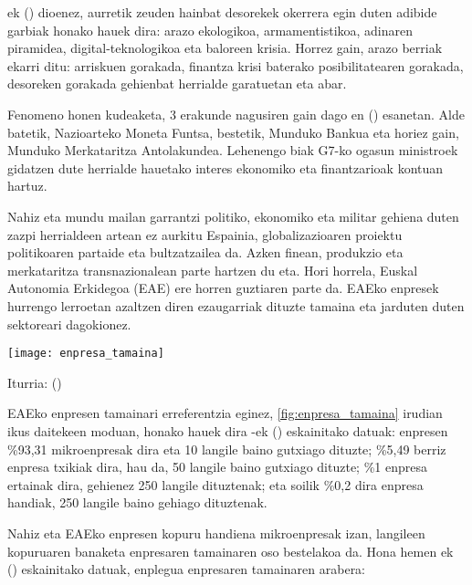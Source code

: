 \citeauthor{rodriguez2017aumentado}ek (\citeyear{rodriguez2017aumentado}) dioenez, aurretik zeuden hainbat desorekek okerrera egin duten adibide garbiak honako hauek dira: arazo ekologikoa, armamentistikoa, adinaren piramidea, digital-teknologikoa eta baloreen krisia. Horrez gain, arazo berriak ekarri ditu: arriskuen gorakada, finantza krisi baterako posibilitatearen gorakada, desoreken gorakada gehienbat herrialde garatuetan eta abar.

Fenomeno honen kudeaketa, 3 erakunde nagusiren gain dago \citeauthor{stiglitz2002malestar}en (\citeyear{stiglitz2002malestar}) esanetan. Alde batetik, Nazioarteko Moneta Funtsa, bestetik, Munduko Bankua eta horiez gain, Munduko Merkataritza Antolakundea. Lehenengo biak G7-ko ogasun ministroek gidatzen dute herrialde hauetako interes ekonomiko eta finantzarioak kontuan hartuz.

Nahiz eta mundu mailan garrantzi politiko, ekonomiko eta militar gehiena duten zazpi herrialdeen artean ez aurkitu Espainia, globalizazioaren proiektu politikoaren partaide eta bultzatzailea da. Azken finean, produkzio eta merkataritza transnazionalean parte hartzen du eta. Hori horrela, Euskal Autonomia Erkidegoa (EAE) ere horren guztiaren parte da. EAEko enpresek hurrengo lerroetan azaltzen diren ezaugarriak dituzte tamaina eta jarduten duten sektoreari dagokionez.

\begin{center}
    \label{fig:enpresa_tamaina}
    \texttt{[image: enpresa\_tamaina]}
    \centering
    \par{Iturria: \citeauthor{confebask2014dimension} (\citeyear{confebask2014dimension})}
\end{center}

EAEko enpresen tamainari erreferentzia eginez, \ref{fig:enpresa_tamaina} irudian ikus daitekeen moduan, honako hauek dira \citeauthor{confebask2014dimension}-ek (\citeyear{confebask2014dimension}) eskainitako datuak: enpresen \%93,31 mikroenpresak dira eta 10 langile baino gutxiago dituzte; \%5,49 berriz enpresa txikiak dira, hau da, 50 langile baino gutxiago dituzte; \%1 enpresa ertainak dira, gehienez 250 langile dituztenak; eta soilik \%0,2 dira enpresa handiak, 250 langile baino gehiago dituztenak.

Nahiz eta EAEko enpresen kopuru handiena mikroenpresak izan, langileen kopuruaren banaketa enpresaren tamainaren oso bestelakoa da. Hona hemen \citeauthor{confebask2014dimension}ek (\citeyear{confebask2014dimension}) eskainitako datuak, enplegua enpresaren tamainaren arabera:

